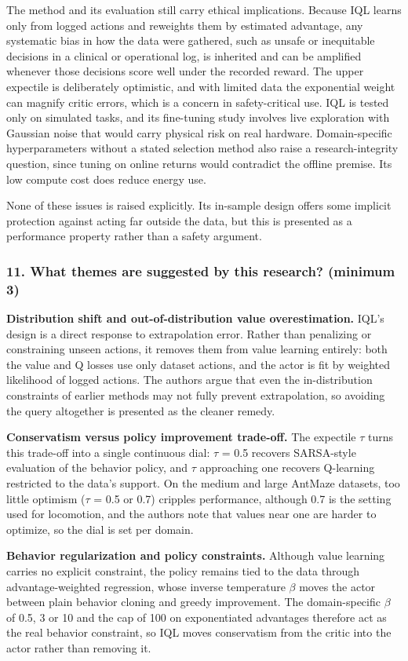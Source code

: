 \documentclass[11pt]{article}
\newcommand{\question}[1]{\subsubsection*{#1}}
\begin{document}
The method and its evaluation still carry ethical implications. Because IQL learns only from logged actions and reweights them by estimated advantage, any systematic bias in how the data were gathered, such as unsafe or inequitable decisions in a clinical or operational log, is inherited and can be amplified whenever those decisions score well under the recorded reward. The upper expectile is deliberately optimistic, and with limited data the exponential weight can magnify critic errors, which is a concern in safety-critical use. IQL is tested only on simulated tasks, and its fine-tuning study involves live exploration with Gaussian noise that would carry physical risk on real hardware. Domain-specific hyperparameters without a stated selection method also raise a research-integrity question, since tuning on online returns would contradict the offline premise. Its low compute cost does reduce energy use.

None of these issues is raised explicitly. Its in-sample design offers some implicit protection against acting far outside the data, but this is presented as a performance property rather than a safety argument.

\question{11. What themes are suggested by this research? (minimum 3)}

\textbf{Distribution shift and out-of-distribution value overestimation.} IQL's design is a direct response to extrapolation error. Rather than penalizing or constraining unseen actions, it removes them from value learning entirely: both the value and Q losses use only dataset actions, and the actor is fit by weighted likelihood of logged actions. The authors argue that even the in-distribution constraints of earlier methods may not fully prevent extrapolation, so avoiding the query altogether is presented as the cleaner remedy.

\textbf{Conservatism versus policy improvement trade-off.} The expectile \ensuremath{\tau} turns this trade-off into a single continuous dial: \ensuremath{\tau} = 0.5 recovers SARSA-style evaluation of the behavior policy, and \ensuremath{\tau} approaching one recovers Q-learning restricted to the data's support. On the medium and large AntMaze datasets, too little optimism (\ensuremath{\tau} = 0.5 or 0.7) cripples performance, although 0.7 is the setting used for locomotion, and the authors note that values near one are harder to optimize, so the dial is set per domain.

\textbf{Behavior regularization and policy constraints.} Although value learning carries no explicit constraint, the policy remains tied to the data through advantage-weighted regression, whose inverse temperature \ensuremath{\beta} moves the actor between plain behavior cloning and greedy improvement. The domain-specific \ensuremath{\beta} of 0.5, 3 or 10 and the cap of 100 on exponentiated advantages therefore act as the real behavior constraint, so IQL moves conservatism from the critic into the actor rather than removing it.
\end{document}
